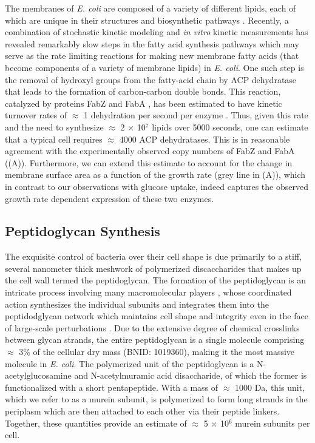 The membranes of \textit{E. coli} are composed of a variety of different lipids,
each of which are unique in their structures and biosynthetic pathways
\citep{sohlenkamp2016}. Recently, a combination of stochastic kinetic modeling
\citep{ruppe2018} and \textit{in vitro} kinetic measurements
\citep{ranganathan2012, yu2011} has revealed remarkably slow steps in the fatty
acid synthesis pathways which may serve as the rate limiting reactions for
making new membrane fatty acids (that become components of a variety of
membrane lipids) in \textit{E. coli}. One such step is the removal of hydroxyl
groups from the fatty-acid chain by ACP dehydratase that leads to the formation
of carbon-carbon double bonds. This reaction, catalyzed by proteins FabZ and
FabA \citep{yu2011}, has been estimated to have kinetic
turnover rates of $\approx$ 1 dehydration per second per enzyme
\citep{ruppe2018}. Thus, given this rate and the need to synthesize $\approx$ 2
$\times$ 10$^7$ lipids over 5000 seconds, one can estimate that a typical cell
requires $\approx$ 4000 ACP dehydratases. This is in reasonable agreement with
the experimentally observed copy numbers of FabZ and FabA
((A)). Furthermore, we can extend this estimate to account
for the change in membrane surface area as a function of the growth rate (grey
line in (A)), which in contrast to our observations with glucose uptake, indeed captures the observed growth rate
dependent expression of these two enzymes.

\subsection{Peptidoglycan Synthesis}
The exquisite control of bacteria over their cell shape is due primarily to a stiff, several nanometer thick meshwork of
polymerized discaccharides that makes up the cell wall termed the peptidoglycan. The formation of the peptidoglycan is an intricate
process involving many macromolecular players \citep{shi2018, morgenstein2015},
whose coordinated action synthesizes the individual subunits and integrates them
into the peptidodglycan network which maintains cell shape and integrity even in the face of
large-scale perturbations \citep{harris2018,shi2018}.
Due to the extensive degree of chemical crosslinks between glycan strands, the
entire peptidoglycan is a single molecule comprising $\approx$ 3\% of the cellular dry mass (BNID:
1019360), making it the most massive molecule in \textit{E. coli}. The
polymerized unit of the peptidoglycan is a N-acetylglucosamine and
N-acetylmuramic acid disaccharide, of which the former is functionalized with a
short pentapeptide. With a mass of $\approx$ 1000 Da, this unit, which we refer
to as a murein subunit, is polymerized to form long strands in the periplasm
which are then attached to each other via their peptide linkers. Together, these
quantities provide an estimate of $\approx$ 5 $\times$ 10$^6$ murein subunits
per cell.

